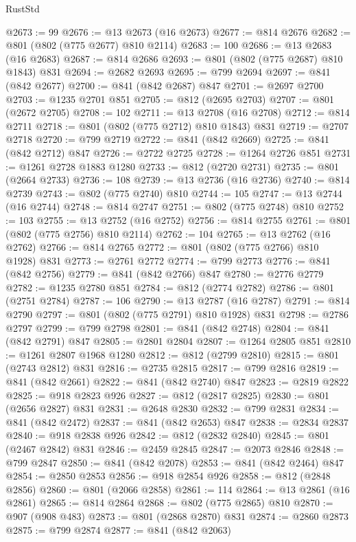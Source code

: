 \begin{lexlean}{RustStd}
\begin{coremodule}
@2673 := 99
@2676 := @13 @2673 (@16 @2673)
@2677 := @814 @2676
@2682 := @801 (@802 (@775 @2677) @810 @2114)
@2683 := 100
@2686 := @13 @2683 (@16 @2683)
@2687 := @814 @2686
@2693 := @801 (@802 (@775 @2687) @810 @1843) @831
@2694 := @2682 @2693
@2695 := @799 @2694
@2697 := @841 (@842 @2677)
@2700 := @841 (@842 @2687) @847
@2701 := @2697 @2700
@2703 := @1235 @2701 @851
@2705 := @812 (@2695 @2703)
@2707 := @801 (@2672 @2705)
@2708 := 102
@2711 := @13 @2708 (@16 @2708)
@2712 := @814 @2711
@2718 := @801 (@802 (@775 @2712) @810 @1843) @831
@2719 := @2707 @2718
@2720 := @799 @2719
@2722 := @841 (@842 @2669)
@2725 := @841 (@842 @2712) @847
@2726 := @2722 @2725
@2728 := @1264 @2726 @851
@2731 := @1261 @2728 @1883 @1280
@2733 := @812 (@2720 @2731)
@2735 := @801 (@2664 @2733)
@2736 := 108
@2739 := @13 @2736 (@16 @2736)
@2740 := @814 @2739
@2743 := @802 (@775 @2740) @810
@2744 := 105
@2747 := @13 @2744 (@16 @2744)
@2748 := @814 @2747
@2751 := @802 (@775 @2748) @810
@2752 := 103
@2755 := @13 @2752 (@16 @2752)
@2756 := @814 @2755
@2761 := @801 (@802 (@775 @2756) @810 @2114)
@2762 := 104
@2765 := @13 @2762 (@16 @2762)
@2766 := @814 @2765
@2772 := @801 (@802 (@775 @2766) @810 @1928) @831
@2773 := @2761 @2772
@2774 := @799 @2773
@2776 := @841 (@842 @2756)
@2779 := @841 (@842 @2766) @847
@2780 := @2776 @2779
@2782 := @1235 @2780 @851
@2784 := @812 (@2774 @2782)
@2786 := @801 (@2751 @2784)
@2787 := 106
@2790 := @13 @2787 (@16 @2787)
@2791 := @814 @2790
@2797 := @801 (@802 (@775 @2791) @810 @1928) @831
@2798 := @2786 @2797
@2799 := @799 @2798
@2801 := @841 (@842 @2748)
@2804 := @841 (@842 @2791) @847
@2805 := @2801 @2804
@2807 := @1264 @2805 @851
@2810 := @1261 @2807 @1968 @1280
@2812 := @812 (@2799 @2810)
@2815 := @801 (@2743 @2812) @831
@2816 := @2735 @2815
@2817 := @799 @2816
@2819 := @841 (@842 @2661)
@2822 := @841 (@842 @2740) @847
@2823 := @2819 @2822
@2825 := @918 @2823 @926
@2827 := @812 (@2817 @2825)
@2830 := @801 (@2656 @2827) @831
@2831 := @2648 @2830
@2832 := @799 @2831
@2834 := @841 (@842 @2472)
@2837 := @841 (@842 @2653) @847
@2838 := @2834 @2837
@2840 := @918 @2838 @926
@2842 := @812 (@2832 @2840)
@2845 := @801 (@2467 @2842) @831
@2846 := @2459 @2845
@2847 := @2073 @2846
@2848 := @799 @2847
@2850 := @841 (@842 @2078)
@2853 := @841 (@842 @2464) @847
@2854 := @2850 @2853
@2856 := @918 @2854 @926
@2858 := @812 (@2848 @2856)
@2860 := @801 (@2066 @2858)
@2861 := 114
@2864 := @13 @2861 (@16 @2861)
@2865 := @814 @2864
@2868 := @802 (@775 @2865) @810
@2870 := @907 (@908 @483)
@2873 := @801 (@2868 @2870) @831
@2874 := @2860 @2873
@2875 := @799 @2874
@2877 := @841 (@842 @2063)

\end{coremodule}
\end{lexlean}
